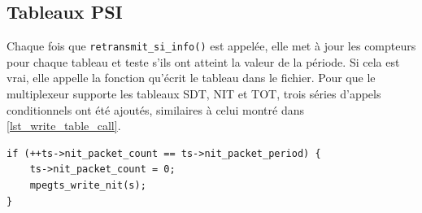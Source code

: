\documentclass[12pt,a4paper]{article}
\begin{document}
\subsection{Tableaux PSI}

Chaque fois que \texttt{retransmit\hspace{0.1mm}\_\hspace{0.1mm}si\hspace{0.1mm}\_\hspace{0.1mm}info()} est appelée, elle met à jour les compteurs pour chaque tableau et teste s'ils ont atteint la valeur de la période. Si cela est vrai, elle appelle la fonction qu'écrit le tableau dans le fichier. Pour que le multiplexeur supporte les tableaux SDT, NIT et TOT, trois séries d'appels conditionnels ont été ajoutés, similaires à celui montré dans \autoref{lst_write_table_call}.

\begin{minipage}{\linewidth}
\begin{lstlisting}[caption={Appel à \texttt{mpegts\hspace{0.1mm}\_\hspace{0.1mm}write\hspace{0.1mm}\_\hspace{0.1mm}nit()}.}, label={lst_write_table_call}]
if (++ts->nit_packet_count == ts->nit_packet_period) {
    ts->nit_packet_count = 0;
    mpegts_write_nit(s);
}
\end{lstlisting}
\end{minipage}


\end{document}
